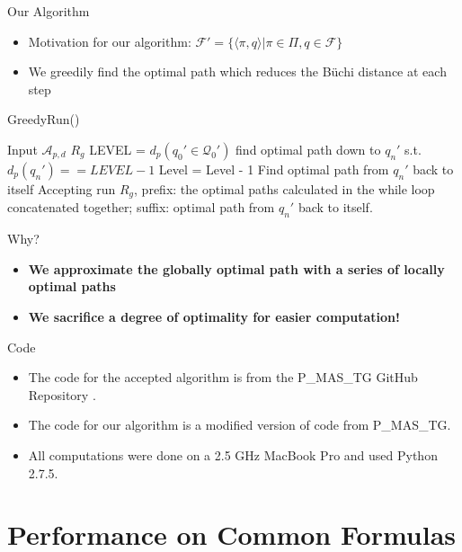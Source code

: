 \documentclass{beamer}
\newcommand{\Q}{\mathcal{Q}}
\newcommand{\A}{\mathcal{A}}
\begin{document}
\begin{frame}{Our Algorithm}
\begin{itemize}
\item {
	Motivation for our algorithm: $\mathcal{F}' = \{ \langle \pi, q \rangle | \pi \in \Pi, q \in \mathcal{F}\}$  
}
\item { 
	We greedily find the optimal path which reduces the B\"uchi distance at each step
	}
\end{itemize}
\begin{algorithm}[H]
\caption{GreedyRun()}
\begin{algorithmic}[1]
\Require Input $\A_{p,d}$
\Ensure $R_{g}$
\State LEVEL = $d_p(q_0' \in \Q_0')$
\State find optimal path down to $q_n'$ s.t. $d_p(q_n')==LEVEL-1$
\State Level = Level - 1	
\EndWhile
\State Find optimal path from $q_n'$ back to itself
\State Accepting run $R_{g}$, prefix: the optimal paths calculated in the while loop concatenated together; suffix: optimal path from $q_n'$ back to itself.
\end{algorithmic}
\end{algorithm}

\end{frame}

\begin{frame}{Why?}
\begin{itemize}
\item {
	\Large \textbf{We approximate the globally optimal path with a series of locally optimal paths}
}
\item {
	\Large \textbf{We sacrifice a degree of optimality for easier computation!}
}
\end{itemize}
\end{frame}

\begin{frame}{Code}
\begin{itemize}
\item The code for the accepted algorithm is from the P\_MAS\_TG GitHub Repository \cite{pMasGit}.
\item The code for our algorithm is a modified version of code from P\_MAS\_TG.
\item All computations were done on a 2.5 GHz MacBook Pro and used Python 2.7.5.
\end{itemize}


\end{frame}
\section{Performance on Common Formulas}
\end{document}
